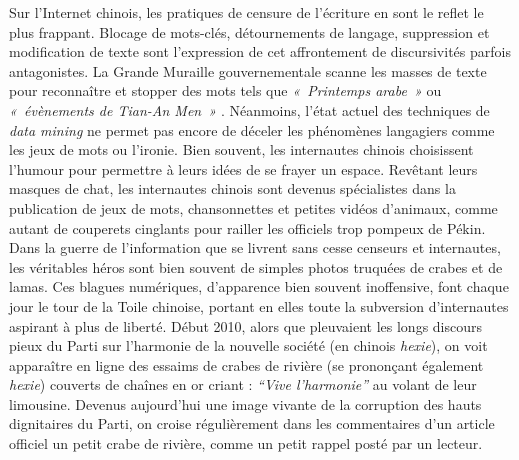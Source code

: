 Sur l’Internet chinois, les pratiques de censure de l’écriture en sont le reflet le plus frappant. Blocage de mots-clés, détournements de langage, suppression et modification de texte sont l’expression de cet affrontement de discursivités parfois antagonistes. La Grande Muraille gouvernementale scanne les masses de texte pour reconnaître et stopper des mots tels que \textit{« Printemps arabe »} ou \textit{« évènements de Tian-An Men »} \citep{MacKinnon2012}. Néanmoins, l’état actuel des techniques de \textit{data mining} ne permet pas encore de déceler les phénomènes langagiers comme les jeux de mots ou l’ironie. Bien souvent, les internautes chinois choisissent l’humour pour permettre à leurs idées de se frayer un espace. Revêtant leurs masques de chat, les internautes chinois sont devenus spécialistes dans la publication de jeux de mots, chansonnettes et petites vidéos d’animaux, comme autant de couperets cinglants pour railler les officiels trop pompeux de Pékin. Dans la guerre de l’information que se livrent sans cesse censeurs et internautes, les véritables héros sont bien souvent de simples photos truquées de crabes et de lamas. Ces blagues numériques, d’apparence bien souvent inoffensive, font chaque jour le tour de la Toile chinoise, portant en elles toute la subversion d’internautes aspirant à plus de liberté. Début 2010, alors que pleuvaient les longs discours pieux du Parti sur l’harmonie de la nouvelle société (en chinois \textit{hexie}), on voit apparaître en ligne des essaims de crabes de rivière (se prononçant également \textit{hexie}) couverts de chaînes en or criant : \textit{“Vive l’harmonie”} au volant de leur limousine. Devenus aujourd’hui une image vivante de la corruption des hauts dignitaires du Parti, on croise régulièrement dans les commentaires d’un article officiel un petit crabe de rivière, comme un petit rappel posté par un lecteur.


